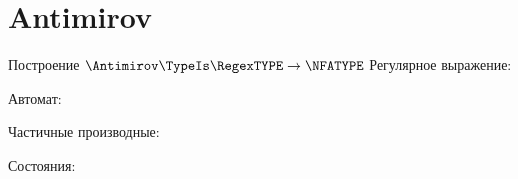 \section{Antimirov}
\begin{frame}{Построение $\Antimirov\TypeIs\RegexTYPE\to\NFATYPE$}
	Регулярное выражение:

	Автомат:


	Частичные производные:


	Состояния:


\end{frame}



